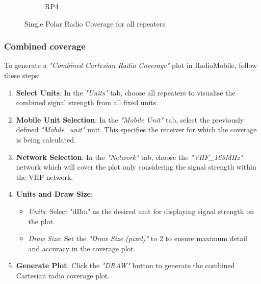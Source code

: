 \begin{figure}[H]
\begin{subfigure}[b]{0.45\textwidth}
            \caption{\small RP4}    
            \label{fig:RP4}
        \end{subfigure}
        \caption{Single Polar Radio Coverage for all repeaters} 
        \label{fig:IndNetCov}
\end{figure}

\subsubsection{Combined coverage}
To generate a \textit{"Combined Cartesian Radio Coverage"} plot in RadioMobile, follow these steps:
\begin{enumerate}
    \item \textbf{Select Units}: In the \textit{"Units"} tab, choose all repeaters to visualise the combined signal strength from all fixed units.
    \item \textbf{Mobile Unit Selection}: In the \textit{"Mobile Unit"} tab, select the previously defined \textit{"Mobile\_unit"} unit. This specifies the receiver for which the coverage is being calculated.
    \item \textbf{Network Selection}: In the \textit{"Network"} tab, choose the \textit{"VHF\_163MHz"} network which will cover the plot only considering the signal strength within the VHF network.
    \item \textbf{Units and Draw Size}:
    \begin{itemize}
        \item \textit{Units}: Select "dBm" as the desired unit for displaying signal strength on the plot.
        \item \textit{Draw Size}: Set the \textit{"Draw Size (pixel)"} to 2 to ensure maximum detail and accuracy in the coverage plot.
    \end{itemize}
    \item \textbf{Generate Plot}: Click the \textit{"DRAW"} button to generate the combined Cartesian radio coverage plot.
\end{enumerate}
